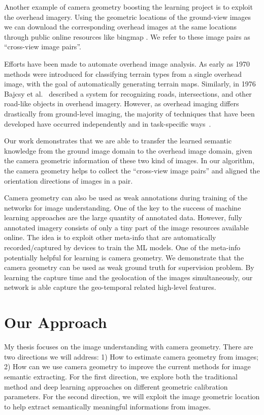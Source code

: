 Another example of camera geometry boosting the learning project is to
exploit the overhead imagery. Using the geometric locations of the
ground-view images we can download the corresponding overhead images
at the same locations through public online resources like bingmap
. We refer to these image pairs as ``cross-view image
pairs''.

 Efforts have been made to
automate overhead image analysis. As early as
1970~\cite{idelsohn1970learning} methods were introduced for
classifying terrain types from a single overhead image, with the goal
of automatically generating terrain maps.  Similarly, in 1976 Bajcsy
et al.~\cite{bajcsy1976computer} described a system for recognizing
roads, intersections, and other road-like objects in overhead imagery.
However, as overhead imaging differs drastically from ground-level
imaging, the majority of techniques that have been developed have
occurred independently and in task-specific ways~\cite{Rozen}.

Our work demonstrates that we are able to transfer the learned semantic
knowledge from the ground image domain to the overhead image domain,
given the camera geometric information of these two kind of images. In
our algorithm, the camera geometry helps to collect the ``cross-view
image pairs'' and aligned the orientation directions of images in a
pair.

Camera geometry can also be used as weak annotations during training
of the networks for image understanding.  One of the key to the
success of machine learning approaches are the large quantity of
annotated data. However, fully annotated imagery consists of only a
tiny part of the image resources available online. The idea is to
exploit other meta-info that are automatically recorded/captured by
devices to train the ML models. One of the meta-info potentially
helpful for learning is camera geometry.  We demonstrate that the
camera geometry can be used as weak ground truth for supervision
problem. By learning the capture time and the geolocation of the
images simultaneously, our network is able capture the geo-temporal
related high-level features.


\section{Our Approach}
My thesis focuses on the image understanding with camera geometry.
There are two directions we will address: 1) How to estimate camera
geometry from images; 2) How can we use camera geometry to improve the
current methods for image semantic extracting. For the first direction,
we explore both the traditional method and deep learning approaches on
different geometric calibration parameters. For the second direction,
we will exploit the image geometric location to help extract
semantically meaningful informations from images.

